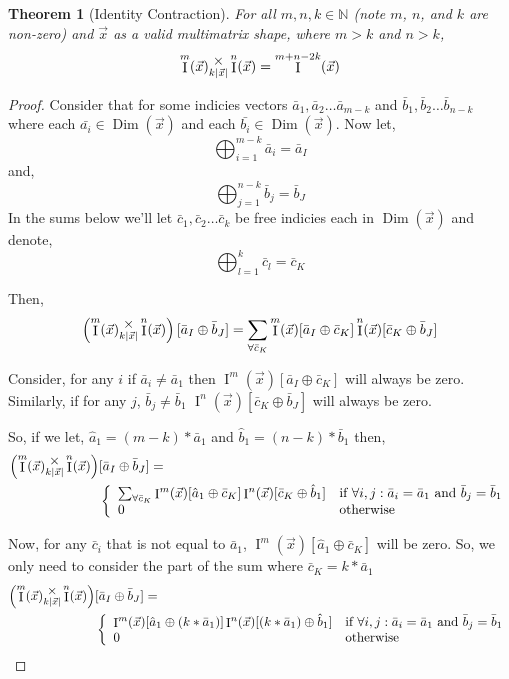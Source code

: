 \documentclass[12pt]{book}
\theoremstyle{plain}
\newtheorem{theorem}{Theorem}[chapter]
\theoremstyle{definition}
\theoremstyle{ppart}
\theoremstyle{case}
\theoremstyle{solution}
\DeclareMathOperator{\Dim}{Dim}
\DeclareMathOperator{\Ident}{I}
\newcommand{\mmult}[1]{\text{\raisebox{1ex}{$\underset{#1}{\times}$}}}
\newcommand{\shape}[1]{\left|#1\right|}
\begin{document}
\begin{landscape}
\begin{theorem}[Identity Contraction]
For all $m, n, k \in \mathbb{N}$ (note $m$, $n$, and $k$ are non-zero) and $\vec{x}$ as a valid multimatrix shape,
where $m > k$ and $n > k$,
\[ \Ident^m(\vec{x}) \mmult{k\shape{\vec{x}}} \Ident^n(\vec{x}) = \Ident^{m+n-2k}(\vec{x}) \]
\end{theorem}
\begin{proof}
Consider that for some indicies vectors
$\bar{a}_1, \bar{a}_2 \ldots \bar{a}_{m-k}$
and $\bar{b}_1, \bar{b}_2 \ldots \bar{b}_{n-k}$ where each
$\bar{a_i} \in \Dim(\vec{x})$ and each $\bar{b_i} \in \Dim(\vec{x})$.
Now let,
\[ \bigoplus_{i=1}^{m-k} \bar{a}_i = \bar{a}_I \]
and,
\[ \bigoplus_{j=1}^{n-k} \bar{b}_j = \bar{b}_J \]
In the sums below we'll let $\bar{c}_1, \bar{c}_2 \ldots \bar{c}_k$ be free indicies
each in $\Dim(\vec{x})$ and denote,
\[ \bigoplus_{l = 1}^k \bar{c}_l = \bar{c}_K \]

Then,
\[
\left( \Ident^m(\vec{x}) \mmult{k\shape{\vec{x}}} \Ident^n(\vec{x}) \right)
[\bar{a}_I \oplus \bar{b}_J] = 
\sum_{\forall \bar{c}_K} \Ident^m(\vec{x}) [\bar{a}_I \oplus \bar{c}_K] \Ident^n(\vec{x}) [\bar{c}_K \oplus \bar{b}_J]
\]

Consider, for any $i$ if $\bar{a}_i \ne \bar{a}_1$ then
$\Ident^m(\vec{x}) [\bar{a}_I \oplus \bar{c}_K]$ will always be zero.
Similarly, if for any $j$, $\bar{b}_j \ne \bar{b}_1$ 
$\Ident^n(\vec{x}) [\bar{c}_K \oplus \bar{b}_J]$ will always be zero.

So, if we let, $\hat{a}_1 = (m-k) * \bar{a}_1$ and $\hat{b}_1 = (n-k) * \bar{b}_1$ then,
\begin{align*}
\left( \Ident^m(\vec{x}) \mmult{k\shape{\vec{x}}} \Ident^n(\vec{x}) \right) &
[\bar{a}_I \oplus \bar{b}_J] = \\
&\left\{
  \begin{array}{ll}
    \sum_{\forall \bar{c}_K}
      \Ident^m(\vec{x}) [\hat{a}_1 \oplus \bar{c}_K] 
      \Ident^n(\vec{x}) [\bar{c}_K \oplus \hat{b}_1]
    & \mbox{if } \forall i, j : \bar{a}_i = \bar{a}_1 \mbox{ and } \bar{b}_j = \bar{b}_1 \\
    0 & \mbox{otherwise}
  \end{array}
\right.
\end{align*}

Now, for any $\bar{c}_i$ that is not equal to $\bar{a}_1$, 
$\Ident^m(\vec{x}) [\hat{a}_1 \oplus \bar{c}_K]$ will be zero.
So, we only need to consider the part of the sum where $\bar{c}_K = k * \bar{a}_1$
\begin{align*}
\left( \Ident^m(\vec{x}) \mmult{k\shape{\vec{x}}} \Ident^n(\vec{x}) \right) &
[\bar{a}_I \oplus \bar{b}_J] = \\
&\left\{
  \begin{array}{ll}
    \Ident^m(\vec{x}) [\hat{a}_1 \oplus (k * \bar{a}_1)] 
    \Ident^n(\vec{x}) [(k * \bar{a}_1) \oplus \hat{b}_1]
    & \mbox{if } \forall i, j : \bar{a}_i = \bar{a}_1 \mbox{ and } \bar{b}_j = \bar{b}_1 \\
    0 & \mbox{otherwise}
  \end{array}
\right.
\end{align*}


\end{proof}
\end{landscape}
\end{document}
